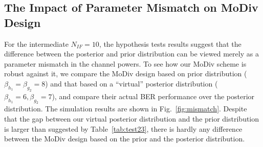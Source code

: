 \documentclass[journal,draftcls,onecolumn,12pt,twoside]{IEEEtran}
\begin{document}
\subsection{The Impact of Parameter Mismatch on MoDiv Design}
For the intermediate $N_{IF} = 10$, the hypothesis tests results suggest that
the difference between the posterior and prior distribution can be viewed merely
as a parameter mismatch in the channel powers. To see how our MoDiv scheme is
robust against it, we compare the MoDiv design based on prior distribution ($\beta_{h_1} = \beta_{g_2}
= 8$) and that based on a ``virtual'' posterior distribution ($\beta_{h_1} = 6,
\beta_{g_2} = 7$), and compare their actual BER performance over the posterior
distribution. The simulation results are shown in Fig.~\ref{fig:mismatch}.
Despite that the gap between our virtual posterior distribution and the prior
distribution is larger than suggested by Table~\ref{tab:test23}, there is hardly
any difference between the MoDiv design based on the prior and the posterior
distribution.
\end{document}
